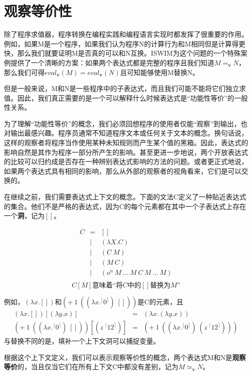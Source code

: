 \documentclass{book}
\def\v{\mathbf{v}}
\begin{document}
\section{观察等价性}
除了程序求值器，程序转换在编程实践和编程语言实现时都发挥了很重要的作用。例如，如果M是一个程序，如果我们认为程序N的计算行为和M相同但是计算得更快，那么我们就要证明M是否真的可以和N互换。ISWIM为这个问题的一个特殊案例提供了一个清晰的方案：如果两个表达式都是完整的程序且我们知道$M=_\mathbf{v}N$，那么我们可得$eval_\v(M) = eval_\v(N)$且可知能够使用M替换N。\par
但是一般来说，M和N是一些程序中的子表达式，而且我们可能不能将它们独立求值。因此，我们真正需要的是一个可以解释什么时候表达式是“功能性等价”的一般性关系。\par
为了理解“功能性等价”的概念，我们必须回想程序的使用者仅能“观察”到输出，也对输出最感兴趣。程序员通常不知道程序文本或任何关于文本的概念。换句话说，这样的观察者将程序当作使用某种未知规则而产生某个值的黑箱。因此，表达式的影响自然是其作为程序一部分所产生的影响。甚至更进一步地说，两个开放表达式的比较可以归约成是否存在一种辨别表达式影响的方法的问题。或者更正式地说，如果两个表达式具有相同的影响，那么从外部的观察者的视角看来，它们是可以交换的。\par
在继续之前，我们需要表达式上下文的概念。下面的文法C定义了一种贴近表达式的集合。他们不是严格的表达式，因为C的每个元素都在其中一个子表达式上存在一个\textbf{洞}，记为$[]$。
\begin{framed}
 $$
 \begin{array}{lcl}
  C & = & []\\
  & | & (\lambda X.C)\\
  & | & (C\ M) \\
  & | & (M\ C) \\
  & | & (o^n\ M\ \ldots\ M\ C\ M\ \ldots\ M)\\
 \end{array}
$$
$$
C[M]\text{意味着“将$C$中的$[]$替换为$M$”}
$$
\end{framed}
例如，$(\lambda x.[])$和$(+\ 1\ ((\lambda x.^\lceil 0^\rceil)\ []))$是C的元素，且
$$
\begin{array}{lcl}
(\lambda x.[])[(\lambda y.x)] &=&  (\lambda x.(\lambda y.x))\\
(+\ 1\ ((\lambda x.^\lceil 0^\rceil)\ []))[(z\ ^\lceil 12^\rceil)] & = &(+\ 1\ ((\lambda x.^\lceil 0^\rceil)\ (z\ ^\lceil 12^\rceil)))
\end{array}
$$
与替换不同的是，填补一个上下文洞可以捕捉变量。\par
根据这个上下文定义，我们可以表示观察等价性的概念，两个表达式M和N是\textbf{观察等价}的，当且仅当它们在所有上下文C中都没有差别，记为$M\simeq_\v N$。
\end{document}
